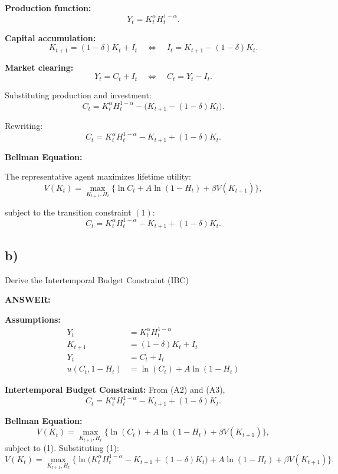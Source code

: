 \documentclass[12pt]{article}
\begin{document}
\noindent \textbf{Production function:}
\[
Y_t = K_t^{\alpha} H_t^{1-\alpha}.
\]

\noindent \textbf{Capital accumulation:}
\[
K_{t+1} = (1 - \delta)K_t + I_t 
\quad \Longleftrightarrow \quad 
I_t = K_{t+1} - (1 - \delta)K_t.
\]

\noindent \textbf{Market clearing:}
\[
Y_t = C_t + I_t 
\quad \Longleftrightarrow \quad 
C_t = Y_t - I_t.
\]

\noindent Substituting production and investment:
\[
C_t = K_t^{\alpha} H_t^{1-\alpha} - \big( K_{t+1} - (1 - \delta)K_t \big).
\]

\noindent Rewriting:
\[
C_t = K_t^{\alpha} H_t^{1-\alpha} - K_{t+1} + (1 - \delta)K_t.
\tag{1}
\]

\noindent \textbf{Bellman Equation:}

The representative agent maximizes lifetime utility:
\[
V(K_t) 
= \max_{K_{t+1}, H_t} 
\Big\{ \ln C_t + A \ln (1 - H_t) + \beta V(K_{t+1}) \Big\},
\tag{2}
\]

\noindent subject to the transition constraint \((1)\):
\[
C_t = K_t^{\alpha} H_t^{1-\alpha} - K_{t+1} + (1 - \delta)K_t.
\]

\subsection*{\noindent\textbf{b)}}

Derive the Intertemporal Budget Constraint (IBC)

\vspace{0.5em}
\noindent\textcolor{formalred}{\textbf{ANSWER:}}


\noindent \textbf{Assumptions:}
\begin{align*}
Y_t &= K_t^{\alpha} H_t^{1-\alpha} \tag{A1} \\
K_{t+1} &= (1-\delta)K_t + I_t \tag{A2} \\
Y_t &= C_t + I_t \tag{A3} \\
u(C_t,1-H_t) &= \ln(C_t) + A\ln(1-H_t) \tag{A4}
\end{align*}

\noindent \textbf{Intertemporal Budget Constraint:} From (A2) and (A3),
\[
C_t = K_t^{\alpha} H_t^{1-\alpha} - K_{t+1} + (1-\delta)K_t. \tag{1}
\]

\noindent \textbf{Bellman Equation:}
\[
V(K_t) = \max_{K_{t+1},H_t} \Big\{ \ln(C_t) + A\ln(1-H_t) + \beta V(K_{t+1}) \Big\},
\tag{2}
\]
subject to (1). Substituting (1):
\[
V(K_t) = \max_{K_{t+1},H_t} \Big\{ 
\ln\!\big( K_t^{\alpha} H_t^{1-\alpha} - K_{t+1} + (1-\delta)K_t \big)
+ A\ln(1-H_t) + \beta V(K_{t+1}) \Big\}.
\tag{3}
\]
\end{document}

